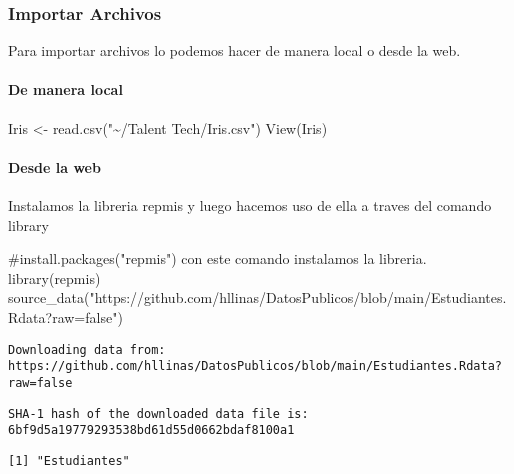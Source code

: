 \documentclass[
  letterpaper,
  DIV=11,
  numbers=noendperiod]{scrartcl}
\let\oldparagraph\paragraph
\renewcommand{\paragraph}[1]{\oldparagraph{#1}\mbox{}}
\newenvironment{Shaded}{\begin{snugshade}}{\end{snugshade}}
\newcommand{\CommentTok}[1]{\textcolor[rgb]{0.37,0.37,0.37}{#1}}
\newcommand{\FunctionTok}[1]{\textcolor[rgb]{0.28,0.35,0.67}{#1}}
\newcommand{\NormalTok}[1]{\textcolor[rgb]{0.00,0.23,0.31}{#1}}
\newcommand{\OtherTok}[1]{\textcolor[rgb]{0.00,0.23,0.31}{#1}}
\newcommand{\StringTok}[1]{\textcolor[rgb]{0.13,0.47,0.30}{#1}}
\begin{document}
\subsubsection{Importar Archivos}\label{importar-archivos}

Para importar archivos lo podemos hacer de manera local o desde la web.

\paragraph{De manera local}\label{de-manera-local}

\begin{Shaded}
\begin{Highlighting}[]
\NormalTok{Iris }\OtherTok{\textless{}{-}} \FunctionTok{read.csv}\NormalTok{(}\StringTok{"\textasciitilde{}/Talent Tech/Iris.csv"}\NormalTok{)}
\FunctionTok{View}\NormalTok{(Iris)}
\end{Highlighting}
\end{Shaded}

\paragraph{Desde la web}\label{desde-la-web}

Instalamos la libreria repmis y luego hacemos uso de ella a traves del
comando library

\begin{Shaded}
\begin{Highlighting}[]
\CommentTok{\#install.packages("repmis") con este comando instalamos la libreria.}
\FunctionTok{library}\NormalTok{(repmis)}
\FunctionTok{source\_data}\NormalTok{(}\StringTok{"https://github.com/hllinas/DatosPublicos/blob/main/Estudiantes.Rdata?raw=false"}\NormalTok{)}
\end{Highlighting}
\end{Shaded}

\begin{verbatim}
Downloading data from: https://github.com/hllinas/DatosPublicos/blob/main/Estudiantes.Rdata?raw=false 
\end{verbatim}

\begin{verbatim}
SHA-1 hash of the downloaded data file is:
6bf9d5a19779293538bd61d55d0662bdaf8100a1
\end{verbatim}

\begin{verbatim}
[1] "Estudiantes"
\end{verbatim}
\end{document}
